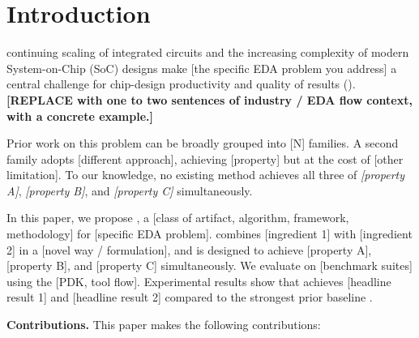 \section{Introduction}
\label{sec:intro}


 continuing scaling of integrated circuits and the
increasing complexity of modern System-on-Chip (SoC) designs make
[the specific EDA problem you address] a central challenge for
chip-design productivity and quality of results (\QoR). \textbf{[REPLACE
with one to two sentences of industry / EDA flow context, with a concrete
example.]}

Prior work on this problem can be broadly grouped into [N] families.
 A second family \cite{PLACEHOLDER_family2_a, PLACEHOLDER_family2_b}
adopts [different approach], achieving [property] but at the cost of
[other limitation]. To our knowledge, no existing method achieves all
three of \textit{[property A]}, \textit{[property B]}, and \textit{[property C]}
simultaneously.

In this paper, we propose \method{}, a [class of artifact, \eg{} algorithm,
framework, methodology] for [specific EDA problem]. \method{} combines
[ingredient 1] with [ingredient 2] in a [novel way / formulation], and is
designed to achieve [property A], [property B], and [property C]
simultaneously. We evaluate \method{} on [benchmark suites] using the
[PDK, tool flow]. Experimental results show that \method{} achieves
[headline result 1] and [headline result 2] compared to the strongest
prior baseline \cite{PLACEHOLDER_baseline}.

\textbf{Contributions.} This paper makes the following contributions:

